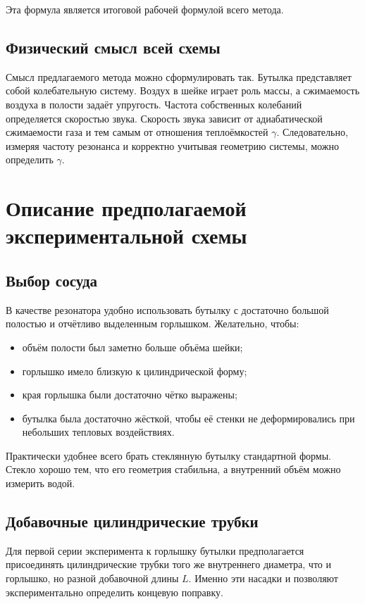 \documentclass[a4paper,12pt]{article}
\begin{document}
	Эта формула является итоговой рабочей формулой всего метода.
	
	\subsection{Физический смысл всей схемы}
	
	Смысл предлагаемого метода можно сформулировать так. Бутылка представляет собой колебательную систему. Воздух в шейке играет роль массы, а сжимаемость воздуха в полости задаёт упругость. Частота собственных колебаний определяется скоростью звука. Скорость звука зависит от адиабатической сжимаемости газа и тем самым от отношения теплоёмкостей \(\gamma\). Следовательно, измеряя частоту резонанса и корректно учитывая геометрию системы, можно определить \(\gamma\).
	
	
	
	\section{Описание предполагаемой экспериментальной схемы}
	
	\subsection{Выбор сосуда}
	
	В качестве резонатора удобно использовать бутылку с достаточно большой полостью и отчётливо выделенным горлышком. Желательно, чтобы:
	\begin{itemize}
		\item объём полости был заметно больше объёма шейки;
		\item горлышко имело близкую к цилиндрической форму;
		\item края горлышка были достаточно чётко выражены;
		\item бутылка была достаточно жёсткой, чтобы её стенки не деформировались при небольших тепловых воздействиях.
	\end{itemize}
	
	Практически удобнее всего брать стеклянную бутылку стандартной формы. Стекло хорошо тем, что его геометрия стабильна, а внутренний объём можно измерить водой.
	
	\subsection{Добавочные цилиндрические трубки}
	
	Для первой серии эксперимента к горлышку бутылки предполагается присоединять цилиндрические трубки того же внутреннего диаметра, что и горлышко, но разной добавочной длины \(L\). Именно эти насадки и позволяют экспериментально определить концевую поправку.
	
\end{document}
